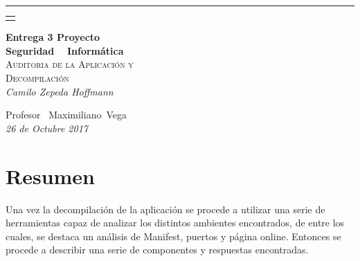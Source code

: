 \documentclass[a4paper,11pt]{article}
\theoremstyle{mytheor}
\begin{document}
\begin{titlepage} %
	
	\raggedleft %
	
	\rule{1pt}{\textheight} %
	\hspace{0.05\textwidth} %
	\parbox[b]{0.75\textwidth}{ %
	 \begin{tabularx}{\linewidth}{}
     \end{tabularx}
     \bigskip
     \vfill
		{\Huge\bfseries Entrega \textnumero{} 3 Proyecto\\[0.5\baselineskip] Seguridad ~ Informática}\\[2\baselineskip] %
		{\large\textsc{Auditoria de la Aplicación y}}\\
		{\large\textsc{Decompilación }}\\[1\baselineskip] %
		{\normalsize\textit{Camilo Zepeda Hoffmann}} %
		
		\vspace{0.5\textheight} %
		
		{\noindent Profesor~ Maximiliano~Vega\plogo}\\[\baselineskip] %
		{\normalsize\textit{26 de Octubre 2017}}
	}

\end{titlepage}


\section{Resumen}

Una vez la decompilación de la aplicación se procede a utilizar una serie de herramientas capaz de analizar los distintos ambientes encontrados, de entre los cuales, se destaca un análisis de Manifest, puertos y página online. Entonces se procede a describir una serie de componentes y respuestas encontradas.
\end{document}
